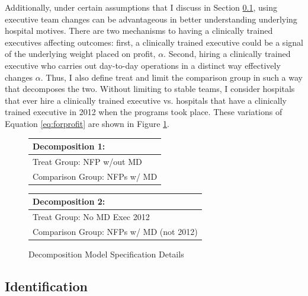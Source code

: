 \documentclass[12pt]{article}
\begin{document}
    Additionally, under certain assumptions that I discuss in Section \ref{sec:identification}, using executive team changes can be advantageous in better understanding underlying hospital motives. There are two mechanisms to having a clinically trained executives affecting outcomes: first, a clinically trained executive could be a signal of the underlying weight placed on profit, $\alpha$. Second, hiring a clinically trained executive who carries out day-to-day operations in a distinct way effectively changes $\alpha$. Thus, I also define treat and limit the comparison group in such a way that decomposes the two. Without limiting to stable teams, I consider hospitals that ever hire a clinically trained executive vs. hospitals that have a clinically trained executive in 2012 when the programs took place. These variations of Equation \ref{eq:forprofit} are shown in Figure \ref{fig:decomp_spec}.

    \begin{figure}[ht!]
    \begin{center}
    \caption{\label{fig:decomp_spec}Decomposition Model Specification Details}
 
 \begin{tabular}{| m{18em} |}
 \hline
 Decomposition 1:\\ [0.5ex]
 \hline\hline 
 \vspace{2mm}
 Treat Group:  \hspace{15mm} NFP w/out MD \\
 \vspace{2mm}
 Comparison Group: \hspace{3mm} NFPs w/ MD  \\
 [1ex]
 \hline
 \end{tabular}
\hfil   %
 \begin{tabular}{|m{18em}|}
 \hline
 Decomposition 2:\\ [0.5ex]
 \hline\hline
 \vspace{2mm}
 Treat Group: \hspace{11mm} No MD Exec 2012 \\
 \vspace{2mm}
 Comparison Group:  NFPs w/ MD (not 2012)  \\
 [1ex]
 \hline
 \end{tabular}
 
\end{center}
 \end{figure}

    \subsection{Identification}\label{sec:identification}
\end{document}
